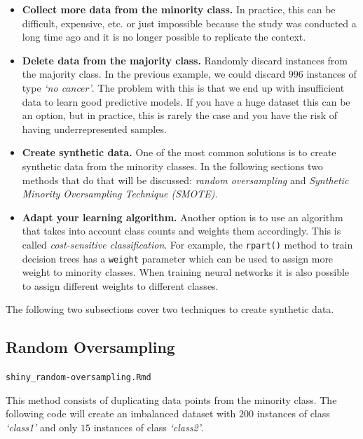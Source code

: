 \documentclass[
  11pt,
]{krantz}
\makeatletter
\newenvironment{kframe}{%
\medskip{}
\setlength{\fboxsep}{.8em}
 \def\at@end@of@kframe{}%
 \ifinner\ifhmode%
  \def\at@end@of@kframe{\end{minipage}}%
  \begin{minipage}{\columnwidth}%
 \fi\fi%
 \def\FrameCommand##1{\hskip\@totalleftmargin \hskip-\fboxsep
 \colorbox{shadecolor}{##1}\hskip-\fboxsep
     \hskip-\linewidth \hskip-\@totalleftmargin \hskip\columnwidth}%
 \MakeFramed {\advance\hsize-\width
   \@totalleftmargin\z@ \linewidth\hsize
   \@setminipage}}%
 {\par\unskip\endMakeFramed%
 \at@end@of@kframe}
\newenvironment{rmdblock}[1]
  {
  \begin{itemize}
  \renewcommand{\labelitemi}{
    \raisebox{-.7\height}[0pt][0pt]{
      {\setkeys{Gin}{width=3em,keepaspectratio}\texttt{[image: images/icons/\#1]}}
    }
  }
  \setlength{\fboxsep}{1em}
  \begin{kframe}
  \item
  }
  {
  \end{kframe}
  \end{itemize}
  }
\newenvironment{rmdshiny}
  {\begin{rmdblock}{touch}}
  {\end{rmdblock}}
\makeatother
\begin{document}
\begin{itemize}
\item
  \textbf{Collect more data from the minority class.} In practice, this can be difficult, expensive, etc. or just impossible because the study was conducted a long time ago and it is no longer possible to replicate the context.
\item
  \textbf{Delete data from the majority class.} Randomly discard instances from the majority class. In the previous example, we could discard \(996\) instances of type \emph{`no cancer'}. The problem with this is that we end up with insufficient data to learn good predictive models. If you have a huge dataset this can be an option, but in practice, this is rarely the case and you have the risk of having underrepresented samples.
\item
  \textbf{Create synthetic data.} One of the most common solutions is to create synthetic data from the minority classes. In the following sections two methods that do that will be discussed: \emph{random oversampling} and \emph{Synthetic Minority Oversampling Technique (SMOTE)}.
\item
  \textbf{Adapt your learning algorithm.} Another option is to use an algorithm that takes into account class counts and weights them accordingly. This is called \emph{cost-sensitive classification}. For example, the \texttt{rpart()} method to train decision trees has a \texttt{weight} parameter which can be used to assign more weight to minority classes. When training neural networks it is also possible to assign different weights to different classes.
\end{itemize}

The following two subsections cover two techniques to create synthetic data.

\hypertarget{random-oversampling}{%
\subsection{Random Oversampling}\label{random-oversampling}}

\begin{rmdshiny}
\texttt{shiny\_random-oversampling.Rmd}
\end{rmdshiny}

This method consists of duplicating data points from the minority class. The following code will create an imbalanced dataset with \(200\) instances of class \emph{`class1'} and only \(15\) instances of class \emph{`class2'}.
\end{document}
